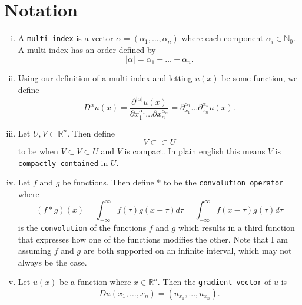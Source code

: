 \documentclass[11pt]{article}
\theoremstyle{definition}
\begin{document}
\newpage

\section*{Notation}
%
\begin{enumerate}[(i)]
	\item A \texttt{multi-index} is a vector $\alpha = (\alpha_1, \dots, \alpha_n)$ where each component $\alpha_i \in \mathbb{N}_0$.
A multi-index has an order defined by
\[|\alpha| = \alpha_1 + \dots + \alpha_n.\]

\item Using our definition of a multi-index and letting $u(x)$ be some function, we define
\[D^{\alpha}u(x) = \frac{\partial^{|\alpha|}u(x)}{\partial x_1^{\alpha_1} \dots \partial x_n^{\alpha_n}} = \partial_{x_1}^{\alpha_1}\dots\partial_{x_n}^{\alpha_n}u(x).\]

\item Let $U,V \subset \mathbb{R}^n$. Then define
\[V \subset\subset U\]
to be when $V \subset \overline{V} \subset U$ and $\overline{V}$ is compact. In plain english this means $V$ is \texttt{compactly contained} in $U$.

\item Let $f$ and $g$ be functions. Then define $*$ to be the \texttt{convolution operator} where
\[(f*g)(x) = \int_{-\infty}^{\infty}{f(\tau)g(x - \tau)d\tau} = \int_{-\infty}^{\infty}{f(x - \tau)g(\tau)d\tau}\]
is the \texttt{convolution} of the functions $f$ and $g$ which results in a third function that expresses
how one of the functions modifies the other. Note that I am assuming $f$ and $g$ are both supported on an
infinite interval, which may not always be the case.

\item Let $u(x)$ be a function where $x \in \mathbb{R}^n$. Then the \texttt{gradient vector} of $u$ is 
	\[Du(x_1,\dots,x_n) = (u_{x_1},...,u_{x_n}).\]
\end{enumerate}

\newpage



\end{document}
